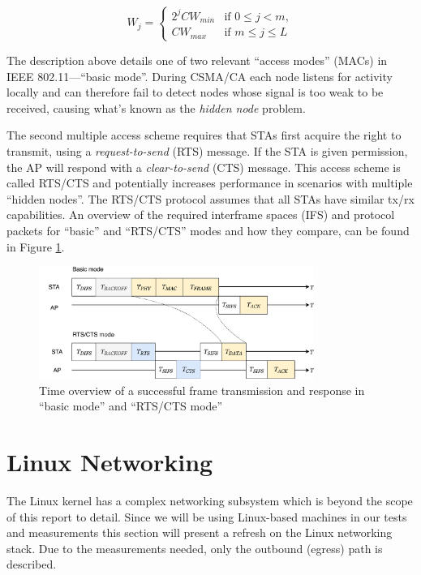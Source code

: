 \begin{equation} \label{eq:cwj}
W_j = \left\{
    \begin{array}{ll}
        2^j \mathit{CW}_{min}  & \mbox{if } 0 \leq j < m, \\
        \mathit{CW}_{max}      & \mbox{if } m \leq j \leq L
    \end{array}
\right.
\end{equation}

The description above details one of two relevant ``access modes'' (MACs) in
IEEE 802.11—``basic mode''. During CSMA/CA each node listens for activity
locally and can therefore fail to detect nodes whose signal is too weak to be
received, causing what's known as the \emph{hidden node} problem.

The second multiple access scheme requires that STAs first acquire the right
to transmit, using a \emph{request-to-send} (RTS) message. If the STA is given
permission, the AP will respond with a \emph{clear-to-send} (CTS) message.
This access scheme is called RTS/CTS and potentially increases performance in
scenarios with multiple ``hidden nodes''. The RTS/CTS protocol assumes that
all STAs  have similar tx/rx capabilities. An overview of the required
interframe spaces (IFS) and protocol packets for ``basic'' and ``RTS/CTS''
modes and how they compare, can be found in Figure \ref{fig:timings}.

\begin{figure}
\center
\includegraphics[width=0.8\textwidth]{images/time-overview.pdf}
\caption{Time overview of a successful frame transmission and response in ``basic mode'' and ``RTS/CTS mode''}
\label{fig:timings}
\end{figure}


\section{Linux Networking}

The Linux kernel has a complex networking subsystem which is beyond the scope
of this report to detail. Since we will be using Linux-based machines in our
tests and measurements this section will present a refresh on the Linux
networking stack. Due to the measurements needed, only the outbound (egress)
path is described.

